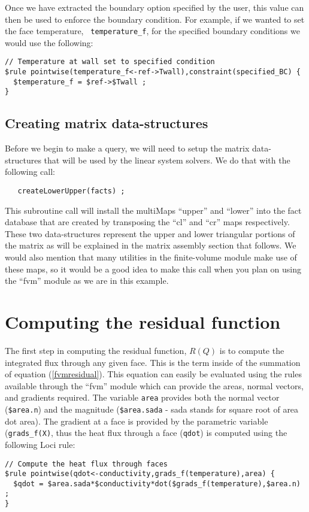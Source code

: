 \documentclass[10pt,epsf,letterpaper,twoside]{book}
\begin{document}
Once we have extracted the boundary option specified by the user, this
value can then be used to enforce the boundary condition.  For
example, if we wanted to set the face temperature, {\tt
  temperature\_f}, for the specified boundary conditions we would use
the following:
\begin{verbatim}
// Temperature at wall set to specified condition
$rule pointwise(temperature_f<-ref->Twall),constraint(specified_BC) {
  $temperature_f = $ref->$Twall ;
}
\end{verbatim}

\subsection{ Creating matrix data-structures}

Before we begin to make a query, we will need to setup the matrix data-structures that will be used by the linear system solvers.  We do that with the following call:
\begin{verbatim}
   createLowerUpper(facts) ;
\end{verbatim}
This subroutine call will install the multiMaps ``upper'' and
``lower'' into the fact database that are created by transposing the
``cl'' and ``cr'' maps respectively.  These two data-structures
represent the upper and lower triangular portions of the matrix as
will be explained in the matrix assembly section that follows.  We
would also mention that many utilities in the finite-volume module
make use of these maps, so it would be a good idea to make this call
when you plan on using the ``fvm'' module as we are in this example.


\section{Computing the residual function}

The first step in computing the residual function, $R(Q)$ is to
compute the integrated flux through any given face.  This is the term
inside of the summation of equation (\ref{fvmresidual}).  This
equation can easily be evaluated using the rules available through the
``fvm'' module which can provide the areas, normal vectors, and
gradients required.  The variable {\tt area} provides both the normal
vector ({\tt \$area.n}) and the magnitude ({\tt \$area.sada} - sada
stands for square root of area dot area).  The gradient at a face is
provided by the parametric variable ({\tt grads\_f(X)}, thus the heat
flux through a face ({\tt qdot}) is computed using the following Loci rule:
\begin{verbatim}
// Compute the heat flux through faces
$rule pointwise(qdot<-conductivity,grads_f(temperature),area) {
  $qdot = $area.sada*$conductivity*dot($grads_f(temperature),$area.n) ;
}
\end{verbatim}
\end{document}
